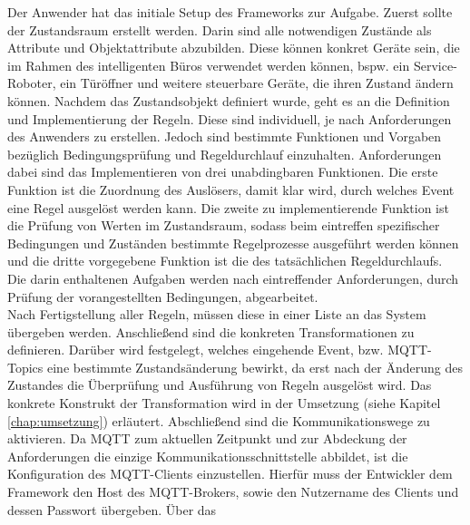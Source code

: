         Der Anwender hat das initiale Setup des Frameworks zur Aufgabe. Zuerst sollte der Zustandsraum erstellt werden. 
        Darin sind alle notwendigen Zustände als Attribute und Objektattribute abzubilden. Diese können konkret Geräte sein, die im Rahmen des 
        intelligenten Büros verwendet werden können, bspw. ein Service-Roboter, ein Türöffner und weitere steuerbare Geräte, die 
        ihren Zustand ändern können. Nachdem das Zustandsobjekt 
        definiert wurde, geht es an die Definition und Implementierung der Regeln. Diese sind individuell, je nach 
        Anforderungen des Anwenders zu erstellen. Jedoch sind bestimmte Funktionen und Vorgaben bezüglich Bedingungsprüfung 
        und Regeldurchlauf einzuhalten. Anforderungen dabei sind das Implementieren von drei unabdingbaren Funktionen. 
        Die erste Funktion ist die Zuordnung des Auslösers, damit klar wird, durch welches Event eine Regel ausgelöst werden kann. 
        Die zweite zu implementierende Funktion ist die Prüfung von Werten im Zustandsraum, sodass beim eintreffen spezifischer 
        Bedingungen und Zuständen bestimmte Regelprozesse ausgeführt werden können und die dritte vorgegebene Funktion ist die 
        des tatsächlichen Regeldurchlaufs. Die darin enthaltenen Aufgaben werden nach eintreffender Anforderungen, durch Prüfung der 
        vorangestellten Bedingungen, abgearbeitet.
        \\
        Nach Fertigstellung aller Regeln, müssen diese in einer Liste an das System übergeben werden. Anschließend sind die 
        konkreten Transformationen zu definieren. Darüber wird festgelegt, welches eingehende Event, bzw. \acs{MQTT}-Topics 
        eine bestimmte Zustandsänderung bewirkt, da erst nach der Änderung des Zustandes die Überprüfung und Ausführung 
        von Regeln ausgelöst wird. Das konkrete Konstrukt der Transformation wird in der Umsetzung (siehe Kapitel \ref{chap:umsetzung}) 
        erläutert. Abschließend sind die Kommunikationswege zu aktivieren. 
        Da \acs{MQTT} zum aktuellen Zeitpunkt und zur Abdeckung der Anforderungen die einzige Kommunikationsschnittstelle 
        abbildet, ist die Konfiguration des \acs{MQTT}-Clients einzustellen. Hierfür muss der Entwickler 
        dem Framework den Host des \acs{MQTT}-Brokers, sowie den Nutzername des Clients und dessen Passwort übergeben. Über das 
